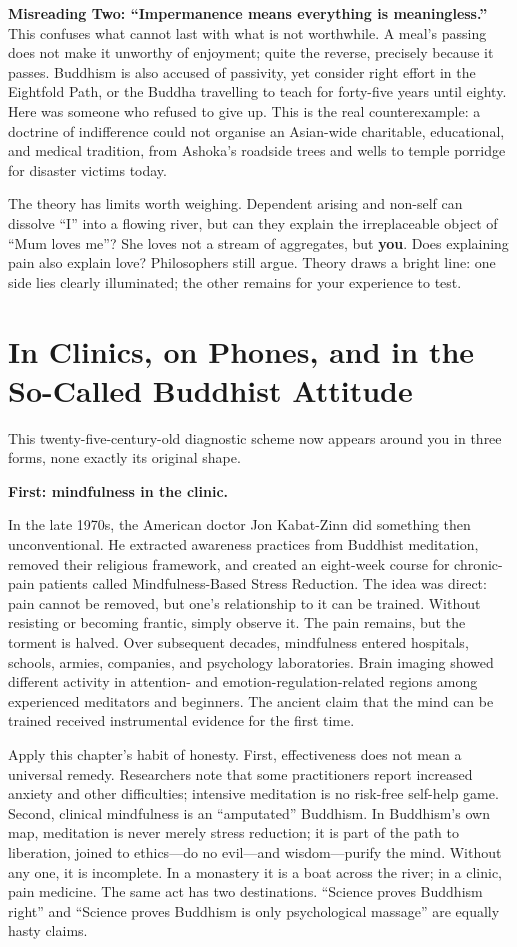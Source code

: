 \textbf{Misreading Two: ``Impermanence means everything is meaningless.''} This confuses what cannot last with what is not worthwhile. A meal's passing does not make it unworthy of enjoyment; quite the reverse, precisely because it passes. Buddhism is also accused of passivity, yet consider right effort in the Eightfold Path, or the Buddha travelling to teach for forty-five years until eighty. Here was someone who refused to give up. This is the real counterexample: a doctrine of indifference could not organise an Asian-wide charitable, educational, and medical tradition, from Ashoka's roadside trees and wells to temple porridge for disaster victims today.

The theory has limits worth weighing. Dependent arising and non-self can dissolve ``I'' into a flowing river, but can they explain the irreplaceable object of ``Mum loves me''? She loves not a stream of aggregates, but \textbf{you}. Does explaining pain also explain love? Philosophers still argue. Theory draws a bright line: one side lies clearly illuminated; the other remains for your experience to test.

\section[Clinics, Phones, and Being Fo Xi]{In Clinics, on Phones, and in the So-Called Buddhist Attitude}
This twenty-five-century-old diagnostic scheme now appears around you in three forms, none exactly its original shape.

\textbf{First: mindfulness in the clinic.}

In the late 1970s, the American doctor Jon Kabat-Zinn did something then unconventional. He extracted awareness practices from Buddhist meditation, removed their religious framework, and created an eight-week course for chronic-pain patients called Mindfulness-Based Stress Reduction. The idea was direct: pain cannot be removed, but one's relationship to it can be trained. Without resisting or becoming frantic, simply observe it. The pain remains, but the torment is halved. Over subsequent decades, mindfulness entered hospitals, schools, armies, companies, and psychology laboratories. Brain imaging showed different activity in attention- and emotion-regulation-related regions among experienced meditators and beginners. The ancient claim that the mind can be trained received instrumental evidence for the first time.

Apply this chapter's habit of honesty. First, effectiveness does not mean a universal remedy. Researchers note that some practitioners report increased anxiety and other difficulties; intensive meditation is no risk-free self-help game. Second, clinical mindfulness is an ``amputated'' Buddhism. In Buddhism's own map, meditation is never merely stress reduction; it is part of the path to liberation, joined to ethics---do no evil---and wisdom---purify the mind. Without any one, it is incomplete. In a monastery it is a boat across the river; in a clinic, pain medicine. The same act has two destinations. ``Science proves Buddhism right'' and ``Science proves Buddhism is only psychological massage'' are equally hasty claims.

